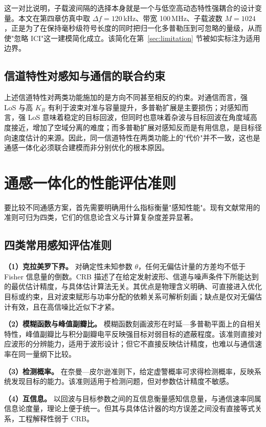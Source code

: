 这一对比说明，子载波间隔的选择本身就是一个与低空高动态特性强耦合的设计变量。本文在第四章仿真中取 $\Delta f = 120$\,kHz、带宽 100\,MHz、子载波数 $M = 1024$，正是为了在保持毫秒级符号长度的同时把归一化多普勒压到可忽略的量级，从而使"忽略 ICI"这一建模简化成立。该简化在第~\ref{sec:limitation} 节被如实标注为适用边界。

\subsection{信道特性对感知与通信的联合约束}
上述信道特性对两类功能施加的是方向不同甚至相反的约束。对通信而言，强 LoS 与高 $K_R$ 有利于波束对准与容量提升，多普勒扩展是主要损伤；对感知而言，强 LoS 意味着稳定的目标回波，但同时也意味着杂波与目标回波在角度域高度接近，增加了空域分离的难度；而多普勒扩展对感知反而是有用信息，是目标径向速度估计的来源。因此，同一信道特性在两类功能上的"代价"并不一致，这也是通感一体化必须联合建模而非分别优化的根本原因。

\section{通感一体化的性能评估准则}
要比较不同通感方案，首先需要明确用什么指标衡量"感知性能"。现有文献常用的准则可归为四类，它们的信息论含义与计算复杂度差异显著。

\subsection{四类常用感知评估准则}
\textbf{（1）克拉美罗下界。} 对确定性未知参数 $\theta$，任何无偏估计量的方差均不低于 Fisher 信息量的倒数。CRB 描述了在给定发射波形、信道与噪声条件下所能达到的最优估计精度，与具体估计算法无关。其优点是物理含义明确、可直接进入优化目标或约束，且对波束赋形与功率分配的依赖关系可解析刻画；缺点是仅对无偏估计有效，且在高信噪比近似下才紧。

\textbf{（2）模糊函数与峰值副瓣比。} 模糊函数刻画波形在时延—多普勒平面上的自相关特性，峰值副瓣比与积分副瓣电平反映强目标对弱目标的遮蔽程度。该准则直接对应波形的分辨能力，适用于波形设计；但它不直接反映估计精度，也难以与通信速率在同一量纲下比较。

\textbf{（3）检测概率。} 在奈曼—皮尔逊准则下，给定虚警概率可求得检测概率，反映系统发现目标的能力。该准则适用于检测问题\cite{huo2024waveform}，但对参数估计精度不敏感。

\textbf{（4）互信息。} 以回波与目标参数之间的互信息衡量感知信息量，与通信速率同属信息论度量，理论上便于统一。但其与具体估计器的均方误差之间没有直接等式关系，工程解释性弱于 CRB。

